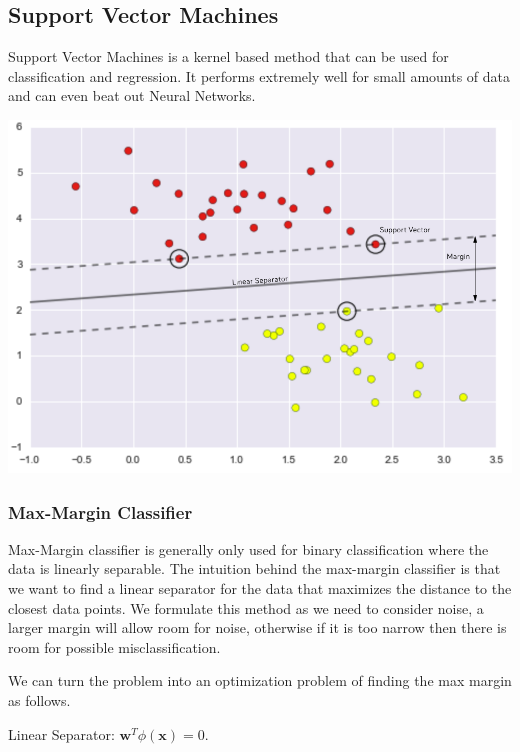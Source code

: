 \documentclass[12pt]{article}
\begin{document}
    \subsection{Support Vector Machines} \label{sec:SVM}
            Support Vector Machines is a kernel based method that can be used for classification and regression. It
            performs extremely well for small amounts of data and can even beat out Neural Networks. 
            \vspace{1em}
            \begin{center}
                \includegraphics[scale=0.35]{SVM}
            \end{center}
        
        \subsubsection{Max-Margin Classifier}
            Max-Margin classifier is generally only used for binary classification where the data is linearly
            separable. The intuition behind the max-margin classifier is that we want to find a linear separator for
            the data that maximizes the distance to the closest data points. We formulate this method as we need to
            consider noise, a larger margin will allow room for noise, otherwise if it is too narrow then there is
            room for possible misclassification.

            We can turn the problem into an optimization problem of finding the max margin as follows.

            Linear Separator: $\boldsymbol{w}^T\phi(\boldsymbol{x}) = 0$.
\end{document}
